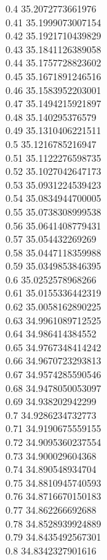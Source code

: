 {0.4	35.2072773661976\\
0.41	35.1999073007154\\
0.42	35.1921710439829\\
0.43	35.1841126389058\\
0.44	35.1757728823602\\
0.45	35.1671891246516\\
0.46	35.1583952203001\\
0.47	35.1494215921897\\
0.48	35.140295376579\\
0.49	35.1310406221511\\
0.5	35.1216785216947\\
0.51	35.1122276598735\\
0.52	35.1027042647173\\
0.53	35.0931224539423\\
0.54	35.0834944700005\\
0.55	35.0738308999538\\
0.56	35.0641408779431\\
0.57	35.054432269269\\
0.58	35.0447118359988\\
0.59	35.0349853846395\\
0.6	35.0252578968266\\
0.61	35.0155336442319\\
0.62	35.0058162890225\\
0.63	34.9961089712525\\
0.64	34.986414384552\\
0.65	34.9767348414242\\
0.66	34.9670723293813\\
0.67	34.9574285590546\\
0.68	34.9478050053097\\
0.69	34.938202942299\\
0.7	34.9286234732773\\
0.71	34.9190675559155\\
0.72	34.9095360237554\\
0.73	34.900029604368\\
0.74	34.890548934704\\
0.75	34.8810945740593\\
0.76	34.8716670150183\\
0.77	34.862266692688\\
0.78	34.8528939924889\\
0.79	34.8435492567301\\
0.8	34.8342327901616\\
}
